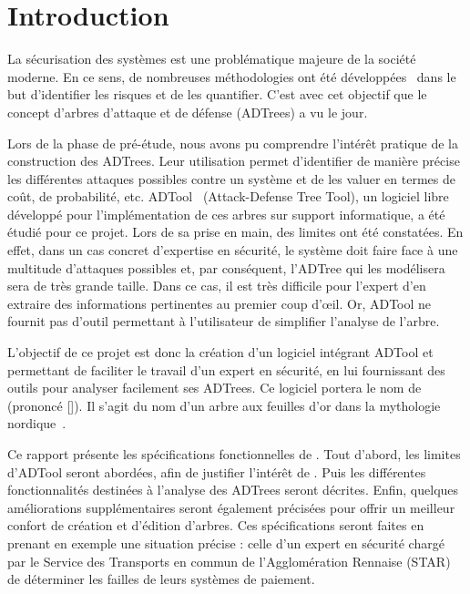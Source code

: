 \section{Introduction}
	La sécurisation des systèmes est une problématique majeure de la société moderne. En ce sens, de nombreuses méthodologies ont été développées~\cite{introSecurite,ADTreeKordy} dans le but d'identifier les risques et de les quantifier. C'est avec cet objectif que le concept d'arbres d'attaque et de défense (ADTrees) a vu le jour.

	Lors de la phase de pré-étude, nous avons pu comprendre l’intérêt pratique de la construction des ADTrees. Leur utilisation permet d'identifier de manière précise les différentes attaques possibles contre un système et de les valuer en termes de coût, de probabilité, etc. ADTool~\cite{adtool_paper} (Attack-Defense Tree Tool), un logiciel libre développé pour l'implémentation de ces arbres sur support informatique, a été étudié pour ce projet. Lors de sa prise en main, des limites ont été constatées. En effet, dans un cas concret d'expertise en sécurité, le système doit faire face à une multitude d'attaques possibles et, par conséquent, l'ADTree qui les modélisera sera de très grande taille. Dans ce cas, il est très difficile pour l'expert d'en extraire des informations pertinentes au premier coup d’œil. Or, ADTool ne fournit pas d'outil permettant à l'utilisateur de simplifier l'analyse de l'arbre. 

	L'objectif de ce projet est donc la création d'un logiciel intégrant ADTool et permettant de faciliter le travail d'un expert en sécurité, en lui fournissant des outils pour analyser facilement ses ADTrees. Ce logiciel portera le nom de \glasir{}  (prononcé []). Il s'agit du nom d'un arbre aux feuilles d'or dans la mythologie nordique~\cite{vikingCulture}.

	Ce rapport présente les spécifications fonctionnelles de \glasir{}. Tout d'abord, les limites d'ADTool seront abordées, afin de justifier l'intérêt de \glasir{}. Puis les différentes fonctionnalités destinées à l'analyse des ADTrees seront décrites. Enfin, quelques améliorations supplémentaires seront également précisées pour offrir un meilleur confort de création et d'édition d'arbres. Ces spécifications seront faites en prenant en exemple une situation précise : celle d'un expert en sécurité chargé par le Service des Transports en commun de l'Agglomération Rennaise (STAR) de déterminer les failles de leurs systèmes de paiement.